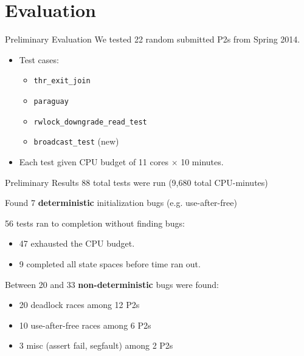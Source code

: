 \documentclass[xcolor=dvipsnames]{beamer}
\begin{document}

\section{Evaluation}


\begin{frame}{Preliminary Evaluation}
	We tested 22 random submitted P2s from Spring 2014.
	\begin{itemize}
		\item Test cases:
		\begin{itemize}
			\item {\tt thr\_exit\_join}
			\item {\tt paraguay}
			\item {\tt rwlock\_downgrade\_read\_test}
			\item {\tt broadcast\_test} (new)
		\end{itemize}
		\item Each test given CPU budget of 11 cores $\times$ 10 minutes.
	\end{itemize}
\end{frame}

\begin{frame}{Preliminary Results}
	88 total tests were run (9,680 total CPU-minutes)
	\linegap

	Found 7 {\bf deterministic} initialization bugs (e.g. use-after-free)
	\linegap

	56 tests ran to completion without finding bugs:
	\begin{itemize}
		\item 47 exhausted the CPU budget.
		\item 9 completed all state spaces before time ran out.
	\end{itemize}
	\linegap

	Between 20 and 33 {\bf non-deterministic} bugs were found:
	\begin{itemize}
		\item 20 deadlock races among 12 P2s
		\item 10 use-after-free races among 6 P2s
		\item 3 misc (assert fail, segfault) among 2 P2s
	\end{itemize}
\end{frame}
\end{document}
